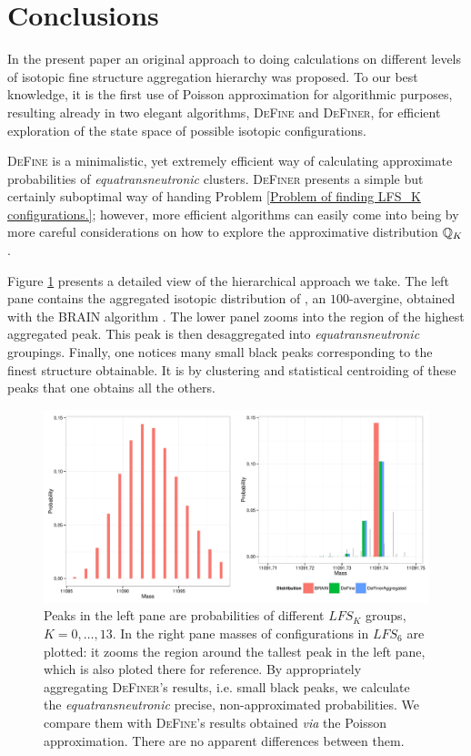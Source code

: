 \section{Conclusions}

	In the present paper an original approach to doing calculations on different levels of isotopic fine structure aggregation hierarchy was proposed. To our best knowledge, it is the first use of Poisson approximation for algorithmic purposes,   resulting already in two elegant algorithms, \textsc{DeFine} and \textsc{DeFiner}, for efficient exploration of the state space of possible isotopic configurations.  

	\textsc{DeFine} is a minimalistic, yet extremely efficient way of calculating approximate probabilities of {\it equatransneutronic} clusters. \textsc{DeFiner} presents a simple but certainly suboptimal way of handing Problem \ref{Problem of finding LFS_K configurations.}; however, more efficient algorithms can easily come into being by more careful considerations on how to explore the approximative distribution $\mathbb{Q}_K$. 

	Figure \ref{figure: hierarchy} presents a detailed view of the hierarchical approach we take. The left pane contains the  aggregated isotopic distribution of \testAvergine, an $100$-avergine, obtained with the {\sc BRAIN} algorithm \cite{Dittwald2013BRAIN}. The lower panel zooms into the region of the highest aggregated peak. This peak is then desaggregated into {\it equatransneutronic} groupings. Finally, one notices many small black peaks corresponding to the finest structure obtainable. It is by clustering and statistical centroiding of these peaks that one obtains all the others. 

\begin{figure}[htbp]
 \centering
 \includegraphics[width=\textwidth]{./img/hierarchyHorizontal}
 \caption{ Peaks in the left pane are probabilities of different $LFS_K$ groups, $K = 0,\dots,13$. In the right pane masses of configurations in $LFS_6$ are plotted: it zooms the region around the tallest peak in the left pane, which is also ploted there for reference. By appropriately aggregating \textsc{DeFiner}'s results, i.e. small black peaks, we calculate the {\it equatransneutronic} precise, non-approximated probabilities. We compare them with \textsc{DeFine}'s results obtained {\it via} the Poisson approximation. There are no apparent differences between them. }
 \label{figure: hierarchy}
\end{figure}



